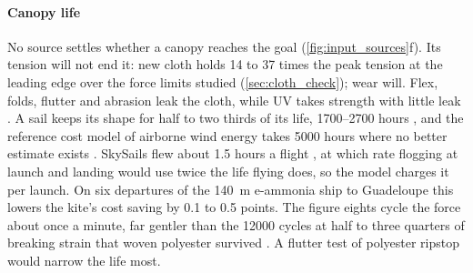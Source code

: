 
\paragraph{Canopy life}
\label{sec:det_canopy_life}
No source settles whether a canopy reaches the goal (\cref{fig:input_sources}f). Its tension will not end it: new cloth holds 14 to 37 times the peak tension at the leading edge over the force limits studied (\cref{sec:cloth_check}); wear will. Flex, folds, flutter and abrasion leak the cloth, while UV takes strength with little leak \citep{maslanka2023}. A sail keeps its shape for half to two thirds of its life, \numrange{1700}{2700} hours \citep{flynn2015}, and the reference cost model of airborne wind energy takes \num{5000} hours where no better estimate exists \citep{joshi2024refeconomic}. SkySails flew about 1.5 hours a flight \citep{skysails2018}, at which rate flogging at launch and landing would use twice the life flying does, so the model charges it per launch. On six departures of the \SI{140}{m} e-ammonia ship to Guadeloupe this lowers the kite's cost saving by 0.1 to 0.5 points. The figure eights cycle the force about once a minute, far gentler than the \num{12000} cycles at half to three quarters of breaking strain that woven polyester survived \citep{nosraty2013}. A flutter test of polyester ripstop would narrow the life most.

